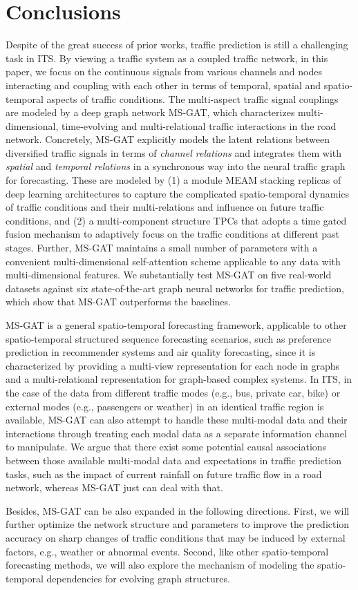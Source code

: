 \section{Conclusions}
Despite of the great success of prior works, traffic prediction is still a challenging task in ITS. By viewing a traffic system as a coupled traffic network, in this paper, we focus on the continuous signals from various channels and nodes interacting and coupling with each other in terms of temporal, spatial and spatio-temporal aspects of traffic conditions. The multi-aspect traffic signal couplings are modeled by a deep graph network MS-GAT, which characterizes multi-dimensional, time-evolving and multi-relational traffic interactions in the road network. Concretely, MS-GAT explicitly models the latent relations between diversified traffic signals in terms of \textit{channel relations} and integrates them  with \textit{spatial} and \textit{temporal relations} in a synchronous way into the neural traffic graph for forecasting. These are modeled by (1) a module MEAM stacking replicas of deep learning architectures to capture the complicated spatio-temporal dynamics of traffic conditions and their multi-relations and influence on future traffic conditions, and (2) a multi-component structure TPCs that adopts a time gated fusion mechanism to adaptively focus on the traffic conditions at different past stages. Further, MS-GAT maintains a small number of parameters with a convenient multi-dimensional self-attention scheme applicable to any data with multi-dimensional features. We substantially test MS-GAT on five real-world datasets against six state-of-the-art graph neural networks for traffic prediction, which show that MS-GAT outperforms the baselines. 

MS-GAT is a general spatio-temporal forecasting framework, applicable to other spatio-temporal structured sequence forecasting scenarios, such as preference prediction in recommender systems and air quality forecasting, since it is characterized by providing a multi-view representation for each node in graphs and a multi-relational representation for graph-based complex systems. In ITS, in the case of the data from different traffic modes (e.g., bus, private car, bike) or external modes (e.g., passengers or weather) in an identical traffic region is available, MS-GAT can also attempt to handle these multi-modal data and their interactions through treating each modal data as a separate information channel to manipulate. We argue that there exist some potential causal associations between those available multi-modal data and expectations in traffic prediction tasks, such as the impact of current rainfall on future traffic flow in a road network, whereas MS-GAT just can deal with that. 

Besides, MS-GAT can be also expanded in the following directions. First, we will further optimize the network structure and parameters to improve the prediction accuracy on sharp changes of traffic conditions that may be induced by external factors, e.g., weather or abnormal events. Second, like other spatio-temporal forecasting methods, we will also explore the mechanism of modeling the spatio-temporal dependencies for evolving graph structures.